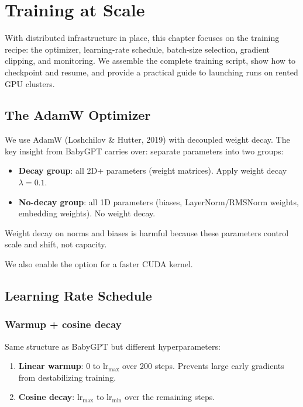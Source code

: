 \chapter{Training at Scale}
\label{ch:training}

With distributed infrastructure in place, this chapter focuses on the training recipe: the optimizer, learning-rate schedule, batch-size selection, gradient clipping, and monitoring.  We assemble the complete training script, show how to checkpoint and resume, and provide a practical guide to launching runs on rented GPU clusters.


\section{The AdamW Optimizer}

We use AdamW (Loshchilov \& Hutter, 2019) with decoupled weight decay.  The key insight from BabyGPT carries over: separate parameters into two groups:

\begin{itemize}
  \item \textbf{Decay group}: all 2D+ parameters (weight matrices).  Apply weight decay $\lambda = 0.1$.
  \item \textbf{No-decay group}: all 1D parameters (biases, LayerNorm/RMSNorm weights, embedding weights).  No weight decay.
\end{itemize}

Weight decay on norms and biases is harmful because these parameters control scale and shift, not capacity.

We also enable the  option for a faster CUDA kernel.


\section{Learning Rate Schedule}

\subsection{Warmup + cosine decay}

Same structure as BabyGPT but different hyperparameters:

\begin{enumerate}
  \item \textbf{Linear warmup}: 0 to $\text{lr}_{\max}$ over 200 steps.  Prevents large early gradients from destabilizing training.
  \item \textbf{Cosine decay}: $\text{lr}_{\max}$ to $\text{lr}_{\min}$ over the remaining steps.
\end{enumerate}

